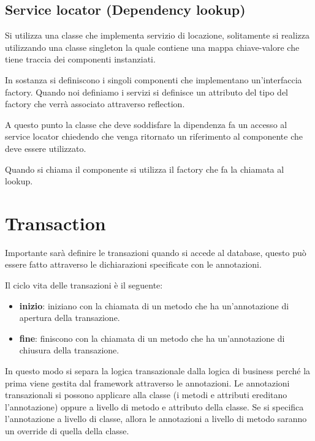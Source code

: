 \subsection{Service locator (Dependency lookup)}
Si utilizza una classe che implementa servizio di locazione, solitamente si realizza
utilizzando una classe singleton la quale contiene una mappa chiave-valore che
tiene traccia dei componenti instanziati.

In sostanza si definiscono i singoli componenti che implementano un'interfaccia
factory. Quando noi definiamo i servizi si definisce un attributo del tipo del
factory che verrà associato attraverso reflection.

A questo punto la classe che deve soddisfare la dipendenza fa un accesso al service
locator chiedendo che venga ritornato un riferimento al componente che deve essere
utilizzato.

Quando si chiama il componente si utilizza il factory che fa la chiamata al lookup.
\section{Transaction}
Importante sarà definire le transazioni quando si accede al database, questo può
essere fatto attraverso le dichiarazioni specificate con le annotazioni.

Il ciclo vita delle transazioni è il seguente:
\begin{itemize}
      \item \textbf{inizio}: iniziano con la chiamata di un metodo che ha un'annotazione
            di apertura della transazione.
      \item \textbf{fine}: finiscono con la chiamata di un metodo che ha un'annotazione
            di chiusura della transazione.
\end{itemize}
In questo modo si separa la logica transazionale dalla logica di business perché
la prima viene gestita dal framework attraverso le annotazioni. Le annotazioni
transazionali si possono applicare alla classe (i metodi e attributi ereditano
l'annotazione) oppure a livello di metodo e attributo della classe. Se si specifica
l'annotazione a livello di classe, allora le annotazioni a livello di metodo saranno
un override di quella della classe.

